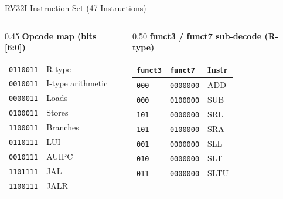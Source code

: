 \documentclass[aspectratio=169,10pt]{beamer}
\begin{document}
\begin{frame}{RV32I Instruction Set (47 Instructions)}
  \vspace{0.8em}
  \begin{columns}[T]
    \begin{column}{0.45\textwidth}
      \textbf{Opcode map (bits [6:0])}\\[0.3em]
      \scriptsize
      \begin{tabular}{ll}
        \texttt{0110011} & R-type \\
        \texttt{0010011} & I-type arithmetic \\
        \texttt{0000011} & Loads \\
        \texttt{0100011} & Stores \\
        \texttt{1100011} & Branches \\
        \texttt{0110111} & LUI \\
        \texttt{0010111} & AUIPC \\
        \texttt{1101111} & JAL \\
        \texttt{1100111} & JALR \\
      \end{tabular}
    \end{column}
    \begin{column}{0.50\textwidth}
      \textbf{funct3 / funct7 sub-decode (R-type)}\\[0.3em]
      \scriptsize
      \begin{tabular}{lll}
        \texttt{funct3} & \texttt{funct7} & Instr \\
        \hline
        \texttt{000} & \texttt{0000000} & ADD \\
        \texttt{000} & \texttt{0100000} & SUB \\
        \texttt{101} & \texttt{0000000} & SRL \\
        \texttt{101} & \texttt{0100000} & SRA \\
        \texttt{001} & \texttt{0000000} & SLL \\
        \texttt{010} & \texttt{0000000} & SLT \\
        \texttt{011} & \texttt{0000000} & SLTU \\
      \end{tabular}
    \end{column}
  \end{columns}
\end{frame}
\end{document}
